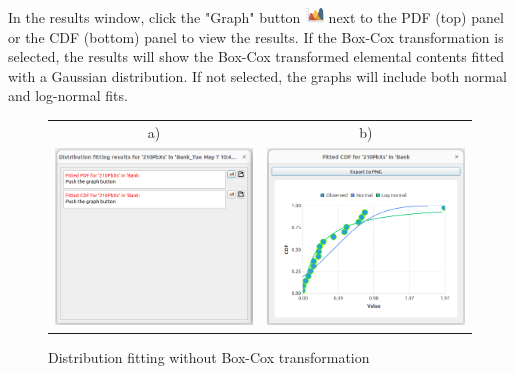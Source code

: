 \documentclass[12pt]{report}
\begin{document}
In the results window, click the "Graph" button \includegraphics[width=0.5cm]{Figures/Graph.png} next to the PDF (top) panel or the CDF (bottom) panel to view the results. If the Box-Cox transformation is selected, the results will show the Box-Cox transformed elemental contents fitted with a Gaussian distribution. If not selected, the graphs will include both normal and log-normal fits. 

\begin{figure}[ht]
    \centering
    \begin{tabular}{c c}
        a) & b) \\
        \includegraphics[width=8cm]{Figures/DF_result_window.png} & \includegraphics[width=8cm]{Figures/DF_graph.png}
    \end{tabular}
    \caption{Distribution fitting without Box-Cox transformation}
    \label{fig:DF-results}
\end{figure}
\FloatBarrier
\end{document}
